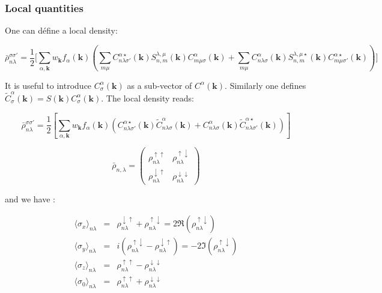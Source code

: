 \documentclass{article}
\begin{document}



\subsubsection{Local quantities}

\noindent
One can défine a local density:

\[ \bar{\rho}^{\sigma \sigma'}_{n \lambda}=\frac{1}{2}\Bigg[\sum_{\alpha,\mathbf{k}} w_{\mathbf{k}}
f_{\alpha}(\mathbf{k})
\left(\sum_{ m \mu} 
C_{n \lambda \sigma'}^{\alpha \star}(\mathbf{k}) 
S_{n,m}^{\lambda,\mu}(\mathbf{k})C_{m\mu \sigma}^{\alpha}(\mathbf{k})+
 \sum_{ m \mu} 
C_{n \lambda \sigma}^{\alpha}(\mathbf{k}) 
S_{n,m}^{\lambda,\mu \star}(\mathbf{k})C_{m \mu \sigma'}^{\alpha \star}(\mathbf{k}) \right) \Bigg]
 \]

\noindent
It is useful to introduce $C_{\sigma}^{\alpha}(\mathbf{k})$ as a sub-vector of
 $C^{\alpha}(\mathbf{k})$. Similarly one defines
 $\widetilde{C}_{\sigma}^{\alpha}(\mathbf{k})=S(\mathbf{k})C_{\sigma}^{\alpha}(\mathbf{k})$.
 The local density reads:
 
\[ \bar{\rho}^{\sigma \sigma'}_{n \lambda}=
\frac{1}{2}\left[\sum_{\alpha,\mathbf{k}} w_{\mathbf{k}}
f_{\alpha}(\mathbf{k}) 
  \left( C_{n \lambda \sigma'}^{\alpha \star}(\mathbf{k}) \widetilde{C}_{n \lambda \sigma}^{\alpha }(\mathbf{k})
+ C_{n \lambda \sigma}^{\alpha}(\mathbf{k}) \widetilde{C}_{n \lambda \sigma'}^{\alpha \star}(\mathbf{k}) \right)
\right]
 \] 




\[ \bar{\rho}_{n,\lambda}=
\left( \begin{array}{cc} \rho_{n \lambda}^{\uparrow \uparrow} & \rho_{n 
\lambda}^{\uparrow \downarrow} \\
\rho_{n \lambda}^{\downarrow \uparrow} & \rho_{n\lambda}^{\downarrow 
\downarrow}
\end{array} \right) \]



\noindent
and we have :

\[ \begin{array}{lcl} 
\langle \sigma_x \rangle_{n \lambda}&=&     \rho^{\downarrow \uparrow}_{n \lambda} +  \rho^{\uparrow \downarrow}_{n \lambda} = 2\Re(\rho^{\uparrow \downarrow}_{n \lambda}) \\ 
\langle\sigma_y\rangle_{n \lambda}&=&   i(\rho^{\uparrow \downarrow}_{n \lambda} -  \rho^{\downarrow \uparrow}_{n \lambda})= -2\Im(\rho^{\uparrow \downarrow}_{n \lambda}) \\ 
\langle\sigma_z\rangle_{n \lambda}&=&     \rho^{\uparrow \uparrow}_{n \lambda}    -  \rho^{\downarrow \downarrow}_{n \lambda} \\
\langle\sigma_0\rangle_{n \lambda}&=&     \rho^{\uparrow \uparrow}_{n \lambda}    +  \rho^{\downarrow \downarrow}_{n \lambda}
\end{array}
\]
\end{document}
